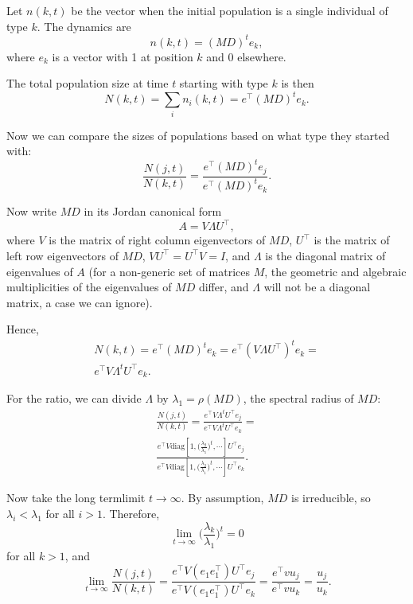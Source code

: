\documentclass[9pt, a4paper, twocolumn]{extarticle}   	%
\newcommand*{\tr}{^\intercal}
\newcommand{\matrx}[1]{{\left[ \stackrel{}{#1}\right]}}
\newcommand{\diag}[1]{\mbox{diag}\matrx{#1}}
\newcommand{\goesto}{\rightarrow}
\begin{document}
Let $n(k, t)$ be the vector when the initial population is a single individual of type $k$.
The dynamics are
\begin{equation}
n(k,t) = (MD)^t e_k,
\end{equation}
where $e_k$ is a vector with 1 at position $k$ and 0 elsewhere.

The total population size at time $t$ starting with type $k$ is then
\begin{equation}
N(k,t) = \sum_i{n_i(k,t)} = e\tr (MD)^t e_k.
\end{equation}

Now we can compare the sizes of populations based on what type they started
with:
\begin{equation}
\frac{N(j,t)}{N(k,t)} = \frac{e\tr (MD)^t e_j}{e\tr (MD)^t e_k}.
\end{equation}

Now write $MD$ in its Jordan canonical form 
\begin{equation}
A = V \Lambda U\tr,
\end{equation}
where $V$ is the matrix of right column eigenvectors of $MD$,
$U\tr$ is the matrix of left row eigenvectors of $MD$,
$V U\tr = U\tr V = I$, 
and $\Lambda$ is the diagonal matrix of eigenvalues of $A$ 
(for a non-generic set of matrices $M$, the geometric and algebraic multiplicities of the eigenvalues of $MD$ differ, and $\Lambda$ will not be a diagonal matrix, a case we can ignore).

Hence,
\begin{multline}
N(k, t) = 
e\tr (MD)^t e_k =
e\tr  (V \Lambda U\tr)^t e_k = \\
e\tr V \Lambda^t U\tr e_k.
\end{multline}

For the ratio, we can divide $\Lambda$ by $\lambda_1 = \rho(MD)$,
the spectral radius of $MD$:
\begin{multline}
\frac{N(j,t)}{N(k,t)} =
\frac{ e\tr V \Lambda^t U\tr e_j}{ e\tr V \Lambda^t U\tr e_k} = \\
\frac{ e\tr V \diag{1, \Big(\frac{\lambda_2}{\lambda_1}\Big)^t, \cdots} U\tr e_j} { e\tr V \diag{1,\Big(\frac{\lambda_2}{\lambda_1}\Big)^t, \cdots} U\tr e_k}.
\end{multline}

Now take the long termlimit $t \goesto \infty$.
By assumption, $MD$ is irreducible, so $\lambda_i < \lambda_1$ for all $i > 1$.
Therefore,
\begin{equation}
\lim_{t \goesto \infty} \Big( \frac{\lambda_k}{\lambda_1} \Big)^t = 0
\end{equation}
for all $k > 1$, and
\begin{equation}
\lim_{t \goesto \infty}\frac{N(j,t)}{N(k,t)} =
\frac{e\tr V (e_1 e_1\tr) U\tr e_j} { e\tr V (e_1 e_1\tr) U\tr e_k} = 
\frac{ e\tr v u_j} { e\tr v  u_k} =
\frac{u_j} {u_k}.
\end{equation}
\end{document}
